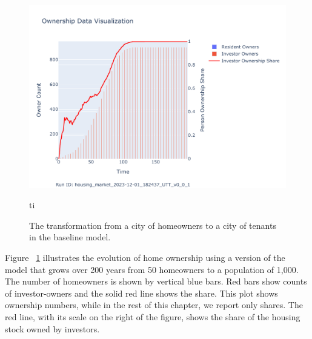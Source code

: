 \begin{figure}[h!tb]
\centering
\hspace{2cm}
\includegraphics[scale=0.9, trim={0 1cm 0 1.8cm}, clip]{fig/Analysis/Ownership_Data_1.pdf}
\caption[The ownership result]{The transformation from a city of homeowners to a city of tenants in the baseline model.}
\label{fig:Baseline_ownership_trajectory}ti
\end{figure}


Figure ~\ref{fig:Baseline_ownership_trajectory} illustrates the evolution of home ownership using a version of the model that grows over 200 years from 50 homeowners to a population of 1,000. The number of homeowners is shown by vertical blue bars.  Red bars show counts of investor-owners and the solid red line shows the share. This plot shows ownership numbers, while in the rest of this chapter, we report only shares. %
The red line, with its scale on the right of the figure, shows the share of the housing stock owned by investors. 

